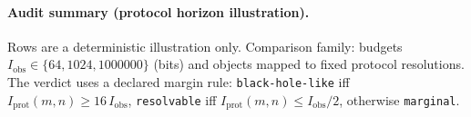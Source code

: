 \paragraph{Audit summary (protocol horizon illustration).} \AuditTag Rows are a deterministic illustration only. Comparison family: budgets $I_{\mathrm{obs}}\in\{64, 1024, 1000000\}$ (bits) and objects mapped to fixed protocol resolutions. The verdict uses a declared margin rule: \texttt{black-hole-like} iff $I_{\mathrm{prot}}(m,n)\ge 16\,I_{\mathrm{obs}}$, \texttt{resolvable} iff $I_{\mathrm{prot}}(m,n)\le I_{\mathrm{obs}}/2$, otherwise \texttt{marginal}.